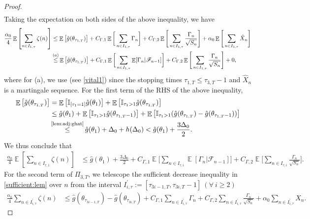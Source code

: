 \documentclass[standalone]{article}
\newcommand{\I}{\mathbb{I}}
\DeclareMathOperator{\Expect}{\mathbb{E}}
\begin{document}
\begin{proof}
\begin{align*}
\end{align*} 
Taking the expectation on both sides of the above inequality, we have
\begin{align*}
\frac{\alpha_{0}}{4}\Expect\left[\sum_{n \in I_{1,\tau}}\zeta(n)\right]&\le\Expect\big[\hat{g}(\theta_{\tau_{1,T}})\big]+C_{\Gamma,1}\Expect\bigg[\sum_{n \in I_{1,\tau}} \Gamma_n \bigg]+C_{\Gamma,2}\Expect\Bigg[\sum_{n \in I_{1,\tau}}\frac{\Gamma_{n}}{\sqrt{S_{n}}}\Bigg]+\alpha_0\Expect\Bigg[\sum_{n \in I_{1,\tau}}\hat{X}_{n}\Bigg]\notag\\&\mathop{\le}^{(a)} \Expect\big[\hat{g}(\theta_{\tau_{1,T}})\big]+C_{\Gamma,1}\Expect\bigg[\sum_{n \in I_{1,\tau}} \Expect[\Gamma_n|\mathscr{F}_{n-1}]\bigg]+C_{\Gamma,2}\Expect\Bigg[\sum_{n \in I_{1,\tau}}\frac{\Gamma_{n}}{\sqrt{S_{n}}}\Bigg]+0,
\end{align*}
where for (a), we use  (see \cref{vital1}) since the stopping times $\tau_{1,T}\le \tau_{3,T}-1$ and $\hat{X}_n$ is a martingale sequence. For the first term of the RHS of the above inequality,
\begin{align*}
\Expect\big[\hat{g}(\theta_{\tau_{1,T}})\big]&=\Expect\big[\I_{[\tau_{1}=1]}\hat{g}(\theta_{1})\big]+\Expect\big[\I_{\tau_{1}>1}\hat{g}(\theta_{\tau_{1,T}})\big] \\&\le \hat{g}(\theta_{1})+ \Expect\big[\I_{\tau_{1}>1}\hat{g}(\theta_{\tau_{1,T}-1})\big]+\Expect\big[\I_{\tau_{1}>1}(\hat{g}(\theta_{\tau_{1,T}})-\hat{g}(\theta_{\tau_{1,T}-1}))\big]\\&\mathop{\le}^{\text{\cref{lem:adj:ghat}}} \hat{g}(\theta_{1})+\Delta_{0}+h(\Delta_{0})<\hat{g}(\theta_{1})+\frac{3\Delta_{0}}{2}.
\end{align*}
We thus conclude that 
\begin{align}\label{inequ:stat:1'}
\frac{\alpha_{0}}{4}\Expect\left[\sum_{n \in I_{\tau,1}}\zeta(n)\right]&\le\hat{g}(\theta_{1})+\frac{3\Delta_{0}}{2}+C_{\Gamma,1}\Expect\bigg[\sum_{n \in I_{\tau,i}} \Expect[\Gamma_n|\mathscr{F}_{n-1}] \bigg]+C_{\Gamma,2}\Expect\Bigg[\sum_{n \in I_{\tau,i}}\frac{\Gamma_{n}}{\sqrt{S_{n}}}\Bigg].
\end{align}
For the second term of $\Pi_{3,T}$, we telescope the sufficient decrease inequality in \cref{sufficient:lem} over $n$ from the interval \( I_{i,\tau}^{'}:= [\tau_{3i-1,T}, \tau_{3i,T}-1 ]\ (\forall\ i\ge 2)\)
\begin{align}\label{inequ:stab:2}
\frac{\alpha_{0}}{4}\sum_{n \in I_{i,\tau}^{'}}\zeta(n)&\le \hat{g}(\theta_{\tau_{3i-1,T}})-\hat{g}(\theta_{\tau_{3i,T}})+C_{\Gamma,1}\sum_{n \in I_{i,\tau}^{'}} \Gamma_n+C_{\Gamma,2}\sum_{n \in I_{i,\tau}^{'}}\frac{\Gamma_{n}}{\sqrt{S_{n}}}+\alpha_0 \sum_{n \in I_{i,\tau}^{'}}\hat{X}_{n}.

\end{align}
\end{proof}
\end{document}
